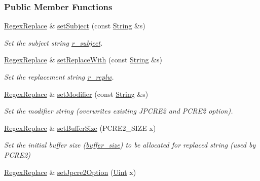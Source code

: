 \subsubsection*{Public Member Functions}
\begin{DoxyCompactItemize}
\item 
\hyperlink{classjpcre2_1_1RegexReplace}{Regex\+Replace} \& \hyperlink{classjpcre2_1_1RegexReplace_a46eefdb105827920bebc8436721fa4cb}{set\+Subject} (const \hyperlink{namespacejpcre2_a91f03070152fb228bc116c5a737f1d16}{String} \&s)
\begin{DoxyCompactList}\small\item\em Set the subject string \hyperlink{classjpcre2_1_1RegexReplace_a2290e5d9f1c2336abd431fef97e72c93}{r\+\_\+subject}. \end{DoxyCompactList}\item 
\hyperlink{classjpcre2_1_1RegexReplace}{Regex\+Replace} \& \hyperlink{classjpcre2_1_1RegexReplace_af1069f489de9b343493da2dc77b04c73}{set\+Replace\+With} (const \hyperlink{namespacejpcre2_a91f03070152fb228bc116c5a737f1d16}{String} \&s)
\begin{DoxyCompactList}\small\item\em Set the replacement string \hyperlink{classjpcre2_1_1RegexReplace_a73d0da1aac8b83a0a47b24629b5013f4}{r\+\_\+replw}. \end{DoxyCompactList}\item 
\hyperlink{classjpcre2_1_1RegexReplace}{Regex\+Replace} \& \hyperlink{classjpcre2_1_1RegexReplace_ae2abe2994b0fbe54950f88e63000c910}{set\+Modifier} (const \hyperlink{namespacejpcre2_a91f03070152fb228bc116c5a737f1d16}{String} \&s)
\begin{DoxyCompactList}\small\item\em Set the modifier string (overwrites existing J\+P\+C\+R\+E2 and P\+C\+R\+E2 option). \end{DoxyCompactList}\item 
\hyperlink{classjpcre2_1_1RegexReplace}{Regex\+Replace} \& \hyperlink{classjpcre2_1_1RegexReplace_a452dd2632031a13b39c13b792f18a491}{set\+Buffer\+Size} (P\+C\+R\+E2\+\_\+\+S\+I\+ZE x)
\begin{DoxyCompactList}\small\item\em Set the initial buffer size (\hyperlink{classjpcre2_1_1RegexReplace_a44abce541819ceb51e342411b48e95cb}{buffer\+\_\+size}) to be allocated for replaced string (used by P\+C\+R\+E2) \end{DoxyCompactList}\item 
\hyperlink{classjpcre2_1_1RegexReplace}{Regex\+Replace} \& \hyperlink{classjpcre2_1_1RegexReplace_a745ab0b979035214a83ed0a04686ef6a}{set\+Jpcre2\+Option} (\hyperlink{namespacejpcre2_a078242d38221a13fb3543b9edd78c099}{Uint} x)

\end{DoxyCompactItemize}
